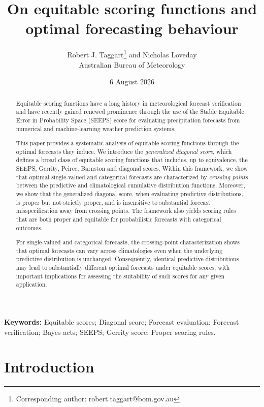\documentclass[10pt]{article} %
\title{On equitable scoring functions and optimal forecasting behaviour}
\author{Robert J. Taggart\thanks{Corresponding author: robert.taggart@bom.gov.au} \quad and \quad Nicholas Loveday\\[1ex] Australian Bureau of Meteorology}
\date{6 August 2026}
\theoremstyle{theorem}
\theoremstyle{definition}
\begin{document}
\maketitle



\begin{abstract}
\noindent Equitable scoring functions have a long history in meteorological forecast verification and have recently gained renewed prominence through the use of the Stable Equitable Error in Probability Space (SEEPS) score for evaluating precipitation forecasts from numerical and machine-learning weather prediction systems.

This paper provides a systematic analysis of equitable scoring functions through the optimal forecasts they induce. We introduce the \textit{generalized diagonal score}, which defines a broad class of equitable scoring functions that includes, up to equivalence, the SEEPS, Gerrity, Peirce, Barnston and diagonal scores. Within this framework, we show that optimal single-valued and categorical forecasts are characterized by \textit{crossing points} between the predictive and climatological cumulative distribution functions. Moreover, we show that the generalized diagonal score, when evaluating predictive distributions, is proper but not strictly proper, and is insensitive to substantial forecast misspecification away from crossing points. The framework also yields scoring rules that are both proper and equitable for probabilistic forecasts with categorical outcomes.

For single-valued and categorical forecasts, the crossing-point characterization shows that optimal forecasts can vary across climatologies even when the underlying predictive distribution is unchanged. Consequently, identical predictive distributions may lead to substantially different optimal forecasts under equitable scores, with important implications for assessing the suitability of such scores for any given application.
\end{abstract}


\vspace{10pt}

\noindent\textbf{Keywords:} Equitable scores; Diagonal score; Forecast evaluation; Forecast verification; Bayes acts; SEEPS; Gerrity score; Proper scoring rules.



\section{Introduction}\label{s:intro}
\end{document}
